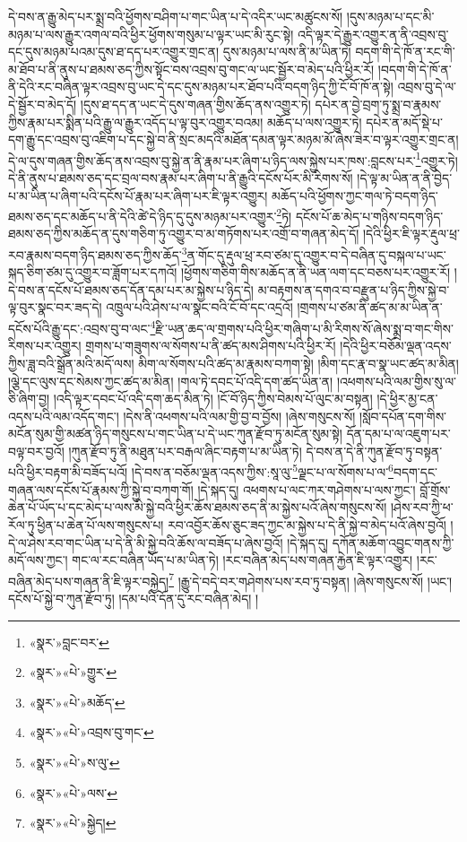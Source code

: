 དེ་བས་ན་རྒྱུ་མེད་པར་སྨྲ་བའི་ཕྱོགས་བཤིག་པ་གང་ཡིན་པ་དེ་འདིར་ཡང་མཚུངས་སོ། །དུས་མཉམ་པ་དང་མི་མཉམ་པ་ལས་རྒྱུར་འགལ་བའི་ཕྱིར་ཕྱོགས་གསུམ་པ་ལྟར་ཡང་མི་རུང་སྟེ། འདི་ལྟར་དེ་རྒྱུར་འགྱུར་ན་ནི་འབྲས་བུ་དང་དུས་མཉམ་པའམ་དུས་ཐ་དད་པར་འགྱུར་གྲང་ན། དུས་མཉམ་པ་ལས་ནི་མ་ཡིན་ཏེ། བདག་གི་དེ་ཁོ་ན་རང་གི་མ་ཐོབ་པ་ནི་ནུས་པ་ཐམས་ཅད་ཀྱིས་སྟོང་བས་འབྲས་བུ་གང་ལ་ཡང་སྦྱོར་བ་མེད་པའི་ཕྱིར་རོ། །བདག་གི་དེ་ཁོ་ན་ནི་དེའི་རང་བཞིན་ལྟར་འབྲས་བུ་ཡང་དེ་དང་དུས་མཉམ་པར་ཐོབ་པའི་བདག་ཉིད་ཀྱི་ངོ་བོ་ཁོ་ན་སྟེ། འབྲས་བུ་དེ་ལ་དེ་སྦྱོར་བ་མེད་དོ། །དུས་ཐ་དད་ན་ཡང་དེ་དུས་གཞན་གྱིས་ཆོད་ནས་འགྱུར་ཏེ། དཔེར་ན་བྱེ་བྲག་ཏུ་སྨྲ་བ་རྣམས་ཀྱིས་རྣམ་པར་སྨིན་པའི་རྒྱུ་ལ་རྒྱུར་འདོད་པ་ལྟ་བུར་འགྱུར་བའམ། མཆོད་པ་ལས་འགྱུར་ཏེ། དཔེར་ན་མདོ་སྡེ་པ་དག་རྒྱུ་དང་འབྲས་བུ་འཇིག་པ་དང་སྐྱེ་བ་ནི་སྲང་མདའི་མཐོན་དམན་ལྟར་མཉམ་མོ་ཞེས་ཟེར་བ་ལྟར་འགྱུར་གྲང་ན། དེ་ལ་དུས་གཞན་གྱིས་ཆོད་ནས་འབྲས་བུ་སྐྱེ་ན་ནི་རྣམ་པར་ཞིག་པ་ཉིད་ལས་སྐྱེས་པར་ཁས་:བླངས་པར་\footnote{«སྣར་»བླང་བར་}འགྱུར་ཏེ། དེ་ནི་ནུས་པ་ཐམས་ཅད་དང་བྲལ་བས་རྣམ་པར་ཞིག་པ་ནི་རྒྱུའི་དངོས་པོར་མི་རིགས་སོ། །དེ་ལྟ་མ་ཡིན་ན་ནི་བྱེད་པ་མ་ཡིན་པ་ཞིག་པའི་དངོས་པོ་རྣམ་པར་ཞིག་པར་ཇི་ལྟར་འགྱུར། མཆོད་པའི་ཕྱོགས་ཀྱང་གལ་ཏེ་བདག་ཉིད་ཐམས་ཅད་དང་མཆོད་པ་ནི་དེའི་ཚེ་དེ་ཉིད་དུ་དུས་མཉམ་པར་འགྱུར་\footnote{«སྣར་»«པེ་»གྱུར་}ཏེ། དངོས་པོ་ཆ་མེད་པ་གཉིས་བདག་ཉིད་ཐམས་ཅད་ཀྱིས་མཆོད་ན་དུས་གཅིག་ཏུ་འགྱུར་བ་མ་གཏོགས་པར་འགྲོ་བ་གཞན་མེད་དོ། །དེའི་ཕྱིར་ཇི་ལྟར་རྡུལ་ཕྲ་རབ་རྣམས་བདག་ཉིད་ཐམས་ཅད་ཀྱིས་ཆོད་\footnote{«སྣར་»«པེ་»མཆོད་}ན་གོང་དུ་རྡུལ་ཕྲ་རབ་ཙམ་དུ་འགྱུར་བ་དེ་བཞིན་དུ་བསྐལ་པ་ཡང་སྐད་ཅིག་ཙམ་དུ་འགྱུར་བ་ཟློག་པར་དཀའོ། །ཕྱོགས་གཅིག་གིས་མཆོད་ན་ནི་ཡན་ལག་དང་བཅས་པར་འགྱུར་རོ། །དེ་བས་ན་དངོས་པོ་ཐམས་ཅད་དོན་དམ་པར་མ་སྐྱེས་པ་ཉིད་དེ། མ་བརྟགས་ན་དགའ་བ་བརྫུན་པ་ཉིད་ཀྱིས་སྐྱེ་བ་ལྟ་བུར་སྣང་བར་ཟད་དེ། འཁྲུལ་པའི་ཤེས་པ་ལ་སྣང་བའི་ངོ་བོ་དང་འདྲའོ། །གྲགས་པ་ཙམ་ནི་ཚད་མ་མ་ཡིན་ན་དངོས་པོའི་རྒྱུ་དང་:འབྲས་བུ་བ་ལང་\footnote{«སྣར་»«པེ་»འབྲས་བུ་གང་}རྫི་ཡན་ཆད་ལ་གྲགས་པའི་ཕྱིར་གཞིག་པ་མི་རིགས་སོ་ཞེས་སྨྲ་བ་གང་གིས་རིགས་པར་འགྱུར། གྲགས་པ་གཟུགས་ལ་སོགས་པ་ནི་ཚད་མས་ཤིགས་པའི་ཕྱིར་རོ། །དེའི་ཕྱིར་བཅོམ་ལྡན་འདས་ཀྱིས་ཟླ་བའི་སྒྲོན་མའི་མདོ་ལས། མིག་ལ་སོགས་པའི་ཚད་མ་རྣམས་བཀག་སྟེ། །མིག་དང་རྣ་བ་སྣ་ཡང་ཚད་མ་མིན། །ལྕེ་དང་ལུས་དང་སེམས་ཀྱང་ཚད་མ་མིན། །གལ་ཏེ་དབང་པོ་འདི་དག་ཚད་ཡིན་ན། །འཕགས་པའི་ལམ་གྱིས་སུ་ལ་ཅི་ཞིག་བྱ། །འདི་ལྟར་དབང་པོ་འདི་དག་ཆད་མིན་ཏེ། །ངོ་བོ་ཉིད་ཀྱིས་བེམས་པོ་ལུང་མ་བསྟན། །དེ་ཕྱིར་མྱ་ངན་འདས་པའི་ལམ་འདོད་གང་། །དེས་ནི་འཕགས་པའི་ལམ་གྱི་བྱ་བ་བྱོས། །ཞེས་གསུངས་སོ། །སློབ་དཔོན་དག་གིས་མངོན་སུམ་གྱི་མཚན་ཉིད་གསུངས་པ་གང་ཡིན་པ་དེ་ཡང་ཀུན་རྫོབ་ཏུ་མངོན་སུམ་སྟེ། དོན་དམ་པ་ལ་འཇུག་པར་བལྟ་བར་བྱའོ། །ཀུན་རྫོབ་ཏུ་ནི་མཐུན་པར་བརྒལ་ཞིང་བརྟག་པ་མ་ཡིན་ཏེ། དེ་བས་ན་དེ་ནི་ཀུན་རྫོབ་ཏུ་བསྟན་པའི་ཕྱིར་བརྟག་མི་བཟོད་པའོ། །དེ་བས་ན་བཅོམ་ལྡན་འདས་ཀྱིས་:སཱ་ལུ་\footnote{«སྣར་»«པེ་»ས་ལུ་}ལྗང་པ་ལ་སོགས་པ་ལ་\footnote{«སྣར་»«པེ་»ལས་}བདག་དང་གཞན་ལས་དངོས་པོ་རྣམས་ཀྱི་སྐྱེ་བ་བཀག་གོ། །དེ་སྐད་དུ། འཕགས་པ་ལང་ཀར་གཤེགས་པ་ལས་ཀྱང་། བློ་གྲོས་ཆེན་པོ་ཡོད་པ་དང་མེད་པ་ལས་མི་སྐྱེ་བའི་ཕྱིར་ཆོས་ཐམས་ཅད་ནི་མ་སྐྱེས་པའོ་ཞེས་གསུངས་སོ། །ཤེས་རབ་ཀྱི་ཕ་རོལ་ཏུ་ཕྱིན་པ་ཆེན་པོ་ལས་གསུངས་པ། རབ་འབྱོར་ཆོས་ཅུང་ཟད་ཀྱང་མ་སྐྱེས་པ་དེ་ནི་སྐྱེ་བ་མེད་པའོ་ཞེས་བྱའོ། །དེ་ལ་ཤེས་རབ་གང་ཡིན་པ་དེ་ནི་མི་སྐྱེ་བའི་ཆོས་ལ་བཟོད་པ་ཞེས་བྱའོ། །དེ་སྐད་དུ། དཀོན་མཆོག་འབྱུང་གནས་ཀྱི་མདོ་ལས་ཀྱང་། གང་ལ་རང་བཞིན་ཡོད་པ་མ་ཡིན་ཏེ། །རང་བཞིན་མེད་པས་གཞན་རྐྱེན་ཇི་ལྟར་འགྱུར། །རང་བཞིན་མེད་པས་གཞན་ནི་ཇི་ལྟར་བསྐྱེད།\footnote{«སྣར་»«པེ་»སྐྱེད།} །རྒྱུ་དེ་བདེ་བར་གཤེགས་པས་རབ་ཏུ་བསྟན། །ཞེས་གསུངས་སོ། །ཡང་། དངོས་པོ་སྐྱེ་བ་ཀུན་རྫོབ་ཏུ། །དམ་པའི་དོན་དུ་རང་བཞིན་མེད། །
